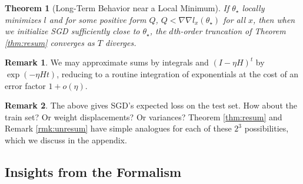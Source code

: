 \documentclass{article}
\theoremstyle{plain}
\newtheorem{thm}{Theorem}
\theoremstyle{definition}
\newtheorem{rmk}{Remark}
\newcommand{\uvalue}{\text{\textnormal{uvalue}}}
\newcommand{\rvalue}{\text{\textnormal{rvalue}}}
\begin{document}
 
        \begin{thm}[Long-Term Behavior near a Local Minimum] \label{thm:converge}
            If $\theta_\star$ locally minimizes $l$ and for some positive form
            $Q$, $Q < \nabla\nabla l_x(\theta_\star)$ for all $x$, then when we
            initialize SGD sufficiently close to $\theta_\star$, the
            $d$th-order truncation of Theorem \ref{thm:resum} converges as $T$
            diverges.
        \end{thm}

 
        \begin{rmk}
            We may approximate sums by integrals and $(I-\eta H)^t$ by $\exp(-
            \eta H t)$, reducing to a routine integration of exponentials
            at the cost of an error factor $1 + o(\eta)$.
        \end{rmk}

        
        \begin{rmk}
            The above gives SGD's expected loss on the test set.  How about
            the train set?  Or weight displacements?  Or variances?
            Theorem \ref{thm:resum} and Remark \ref{rmk:unresum} have simple
            analogues for each of these $2^3$ possibilities, which we discuss
            in the appendix. 
        \end{rmk}

    \subsection{Insights from the Formalism}
    
\end{document}
